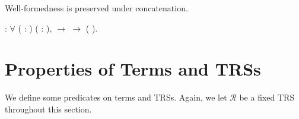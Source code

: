 Well-formedness is preserved under concatenation.
\begin{singlespace}
\begin{coqdoccode}
\coqdocnoindent
{}
 :
\ensuremath{\forall}   
(\coqdocvar{$\varphi$} : 
) (\coqdocvar{$\psi$} : 
),\coqdoceol
\coqdocindent{9.00em}
 \coqdocvariable{$\varphi$}
\ensuremath{\rightarrow}
 \coqdocvariable{$\psi$}
\ensuremath{\rightarrow}
(
\coqdocvariable{$\varphi$} \coqdocvariable{$\psi$}).\coqdoceol
\end{coqdoccode}
\end{singlespace}


\section{Properties of Terms and TRSs}

We define some predicates on terms and TRSs. Again, we let
$\mathcal{R}$ be a fixed TRS throughout this section.


